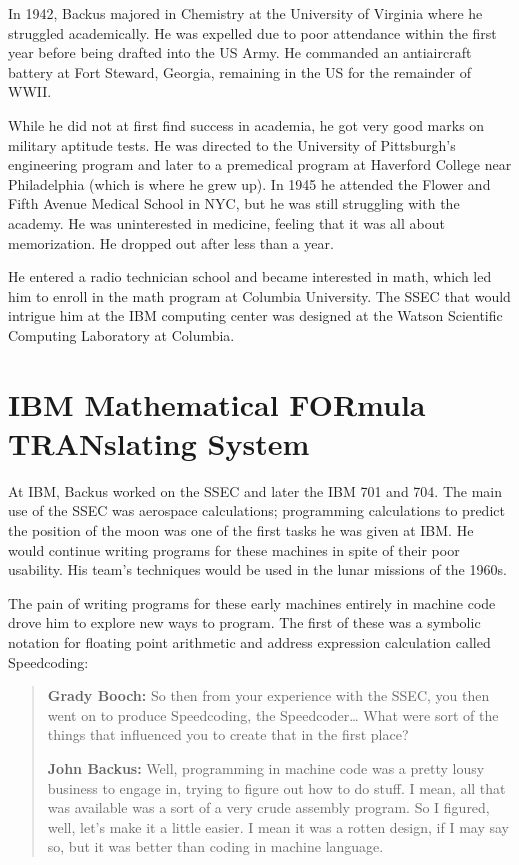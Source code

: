 In 1942, Backus majored in Chemistry at the University of Virginia where he
struggled academically. He was expelled due to poor attendance within the first
year before being drafted into the US Army. He commanded an antiaircraft
battery at Fort Steward, Georgia, remaining in the US for the remainder of
WWII.

While he did not at first find success in academia, he got very good marks on
military aptitude tests. He was directed to the University of Pittsburgh's
engineering program and later to a premedical program at Haverford College near
Philadelphia (which is where he grew up). In 1945 he attended the Flower and
Fifth Avenue Medical School in NYC, but he was still struggling with the
academy. He was uninterested in medicine, feeling that it was all about
memorization. He dropped out after less than a year.

He entered a radio technician school and became interested in math, which led
him to enroll in the math program at Columbia University. The SSEC that would
intrigue him at the IBM computing center was designed at the Watson Scientific
Computing Laboratory at Columbia.

\section{IBM Mathematical FORmula TRANslating System}

At IBM, Backus worked on the SSEC and later the IBM 701 and 704. The main use
of the SSEC was aerospace calculations; programming calculations to predict the
position of the moon was one of the first tasks he was given at IBM. He would
continue writing programs for these machines in spite of their poor usability.
His team's techniques would be used in the lunar missions of the 1960s.

The pain of writing programs for these early machines entirely in machine code
drove him to explore new ways to program. The first of these was a symbolic
notation for floating point arithmetic and address expression calculation
called Speedcoding\cite{backus_oral_history_2006}:

\begin{quotation}
  \textbf{Grady Booch:}
  So then from your experience with the SSEC, you then went on to
  produce Speedcoding, the
  Speedcoder\dots
  What were sort of the things that influenced you to create that in
  the first place?

  \textbf{John Backus:}
  Well, programming in machine code was a pretty lousy business to
  engage in, trying to figure
  out how to do stuff. I mean, all that was available was a sort of a
  very crude assembly program. So I
  figured, well, let's make it a little easier. I mean it was a
  rotten design, if I may say so, but it was better
  than coding in machine language.
\end{quotation}


